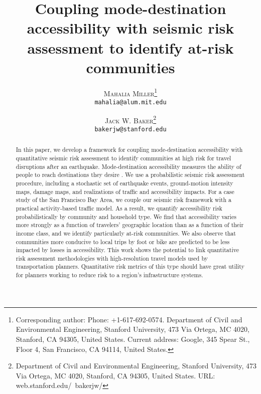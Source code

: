 \documentclass[twoside]{article}
\title{\vspace{-15mm}\fontsize{24pt}{10pt}\selectfont\textbf{Coupling mode-destination accessibility with seismic risk assessment to identify at-risk communities}} %
\author{
 \textsc{Mahalia Miller}\thanks{Corresponding author: Phone: +1-617-692-0574. Department of Civil and Environmental Engineering, Stanford University, 473 Via Ortega, MC 4020, Stanford, CA 94305, United States. Current address: Google, 345 Spear St., Floor 4, San Francisco, CA 94114, United States.}\\
  \texttt{mahalia@alum.mit.edu}
  \and
 \textsc{Jack W. Baker}\thanks{Department of Civil and Environmental Engineering, Stanford University, 473 Via Ortega, MC 4020, Stanford, CA 94305, United States. URL:  web.stanford.edu/~bakerjw/}\\
  \texttt{bakerjw@stanford.edu}
}
\date{}
\newcounter{ead}
\begin{document}
\maketitle %

\thispagestyle{fancy} %


\begin{abstract}
In this paper, we develop a framework for coupling mode-destination accessibility with quantitative seismic risk assessment to identify communities at high risk for travel disruptions after an earthquake. Mode-destination accessibility measures the ability of people to reach destinations they desire%
. We use a probabilistic seismic risk assessment procedure, including a stochastic set of earthquake events, ground-motion intensity maps, damage maps, and realizations of traffic and accessibility impacts. For a case study of the San Francisco Bay Area, we couple our seismic risk framework with a practical activity-based traffic model. As a result, we quantify accessibility risk probabilistically by community and household type. We find that accessibility varies more strongly as a function of travelers' geographic location than as a function of their income class, and we identify particularly at-risk communities.  We also observe that communities more conducive to local trips by foot or bike are predicted to be less impacted by losses in accessibility. This work shows the potential to link quantitative risk assessment methodologies with high-resolution travel models used by transportation planners. Quantitative risk metrics of this type should have great utility for planners working to reduce risk to a region's infrastructure systems.
\end{abstract}
\end{document}
